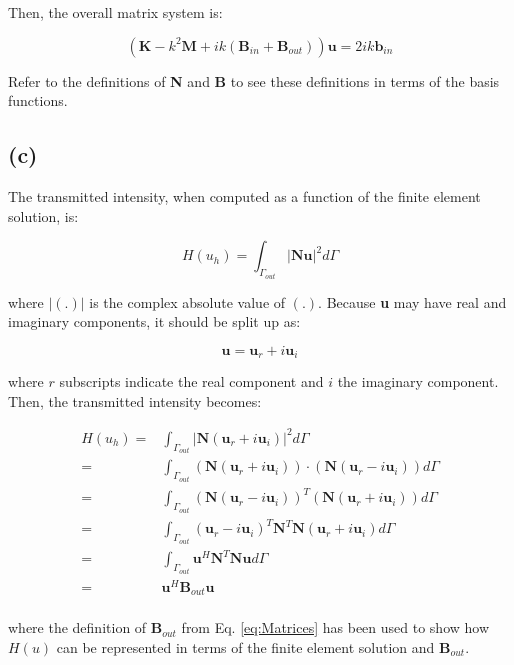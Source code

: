 \documentclass[10pt]{article}
\newcommand{\beq}{\begin{equation}}
\newcommand{\eeq}{\end{equation}}
\newcommand{\beqa}{\begin{equation}\begin{aligned}}
\newcommand{\eeqa}{\end{aligned}\end{equation}}
\begin{document}
Then, the overall matrix system is:

\beq
\left(\textbf{K}-k^2\textbf{M}+ik(\textbf{B}_{in}+\textbf{B}_{out})\right)\textbf{u}=2ik\textbf{b}_{in}
\eeq

Refer to the definitions of \textbf{N} and \textbf{B} to see these definitions in terms of the basis functions.

\subsection{(c)}

The transmitted intensity, when computed as a function of the finite element solution, is:

\beq
H(u_h)=\int_{\Gamma_{out}}|\textbf{N}\textbf{u}|^2d\Gamma
\eeq

where \(|(.)|\) is the complex absolute value of \((.)\). Because \textbf{u} may have real and imaginary components, it should be split up as:

\beq
\textbf{u}=\textbf{u}_r+i\textbf{u}_i
\eeq

where \(r\) subscripts indicate the real component and \(i\) the imaginary component. Then, the transmitted intensity becomes:

\beqa
H(u_h)=&\int_{\Gamma_{out}}|\textbf{N}\left(\textbf{u}_r+i\textbf{u}_i\right)|^2d\Gamma\\
=&\int_{\Gamma_{out}}\left(\textbf{N}(\textbf{u}_r+i\textbf{u}_i)\right)\cdot\left(\textbf{N}(\textbf{u}_r-i\textbf{u}_i)\right)d\Gamma\\
=&\int_{\Gamma_{out}}\left(\textbf{N}(\textbf{u}_r-i\textbf{u}_i)\right)^T\left(\textbf{N}(\textbf{u}_r+i\textbf{u}_i)\right)d\Gamma\\
=&\int_{\Gamma_{out}}(\textbf{u}_r-i\textbf{u}_i)^T\textbf{N}^T\textbf{N}(\textbf{u}_r+i\textbf{u}_i)d\Gamma\\
=&\int_{\Gamma_{out}}\textbf{u}^H\textbf{N}^T\textbf{N}\textbf{u}d\Gamma\\
=\ &\textbf{u}^H\textbf{B}_{out}\textbf{u}\\
\eeqa

where the definition of \(\textbf{B}_{out}\) from Eq. \eqref{eq:Matrices} has been used to show how \(H(u)\) can be represented in terms of the finite element solution and \(\textbf{B}_{out}\).









\section{}
\end{document}
